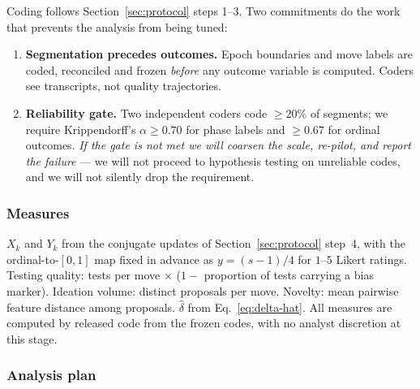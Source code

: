 \documentclass[11pt]{article}
\begin{document}
Coding follows Section~\ref{sec:protocol} steps 1--3. Two commitments do the work that prevents the analysis from being tuned:

\begin{enumerate}[leftmargin=1.8em, itemsep=2pt]
\item \textbf{Segmentation precedes outcomes.} Epoch boundaries and move labels are coded, reconciled and frozen \emph{before} any outcome variable is computed. Coders see transcripts, not quality trajectories.
\item \textbf{Reliability gate.} Two independent coders code $\ge20\%$ of segments; we require Krippendorff's $\alpha\ge0.70$ for phase labels and $\ge0.67$ for ordinal outcomes. \emph{If the gate is not met we will coarsen the scale, re-pilot, and report the failure} --- we will not proceed to hypothesis testing on unreliable codes, and we will not silently drop the requirement.
\end{enumerate}

\subsubsection*{Measures}

$X_k$ and $Y_k$ from the conjugate updates of Section~\ref{sec:protocol} step~4, with the ordinal-to-$[0,1]$ map fixed in advance as $y=(s-1)/4$ for $1$--$5$ Likert ratings. Testing quality: tests per move $\times$ ($1-$ proportion of tests carrying a bias marker). Ideation volume: distinct proposals per move. Novelty: mean pairwise feature distance among proposals. $\hat\delta$ from Eq.~\eqref{eq:delta-hat}. All measures are computed by released code from the frozen codes, with no analyst discretion at this stage.

\subsubsection*{Analysis plan}
\end{document}
